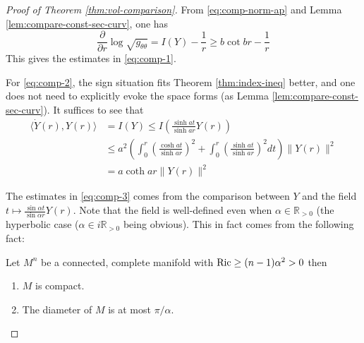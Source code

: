 \documentclass[11pt]{article}
\begin{document}
\begin{proof}[Proof of Theorem \ref{thm:vol-comparison}]
From \eqref{eq:comp-norm-ap} and Lemma \ref{lem:compare-const-sec-curv}, one has 
\[
 \frac{\partial}{\partial r} \log \sqrt{g_{\theta\theta}} = I(Y) - \frac{1}{r} \geq b\cot br -\frac{1}{r}
\]
This gives the estimates in \eqref{eq:comp-1}.

For \eqref{eq:comp-2}, the sign situation fits Theorem \ref{thm:index-ineq} better, and one
does not need to explicitly evoke the space forms (as Lemma
\ref{lem:compare-const-sec-curv}). It suffices to see that
\begin{equation*}
\begin{split}
 \langle \dot Y(r), Y(r) \rangle &=I(Y) \leq I\left(\frac{\sinh at}{\sinh ar}Y(r)\right)\\
 	      	    &\leq a^2\left(\int_0^r \left(\frac{\cosh at}{\sinh ar}\right)^2 + \int_0^r \left(\frac{\sinh at}{\sinh ar}\right)^2 dt  \right)\|Y(r)\|^2\\
		    &= a\coth ar \|Y(r)\|^2
\end{split}   
\end{equation*}

The estimates in  \eqref{eq:comp-3} comes from the comparison between \(Y\) and the
field  \(t\mapsto \frac{\sin \alpha t}{\sin \alpha r}Y(r)\). Note that the field is
well-defined even when \(\alpha \in \mathbb{R}_{>0}\) (the hyperbolic case (\(\alpha\in
i \mathbb{R}_{>0}\) being obvious). This in fact comes from the following fact:
\begin{theorem}[Myers]
\label{thm:myers}
Let \(M^n\) be a connected, complete manifold with \({\rm Ric}\geq (n-1)\alpha^2 >0\)
then
\begin{enumerate}
\item \(M\) is compact.
\item The diameter of \(M\) is at most \(\pi/\alpha\).
\end{enumerate}
\end{theorem}


\end{proof}
\end{document}
